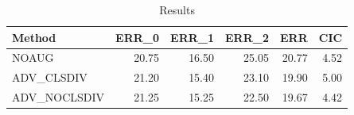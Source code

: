 \begin{table}
\caption{Results}
\label{tab:Results}
\begin{tabular}{lrrrrr}
\toprule
Method & ERR\_0 & ERR\_1 & ERR\_2 & ERR & CIC \\
\midrule
NOAUG & 20.75 & 16.50 & 25.05 & 20.77 & 4.52 \\
ADV\_CLSDIV & 21.20 & 15.40 & 23.10 & 19.90 & 5.00 \\
ADV\_NOCLSDIV & 21.25 & 15.25 & 22.50 & 19.67 & 4.42 \\
\bottomrule
\end{tabular}
\end{table}
